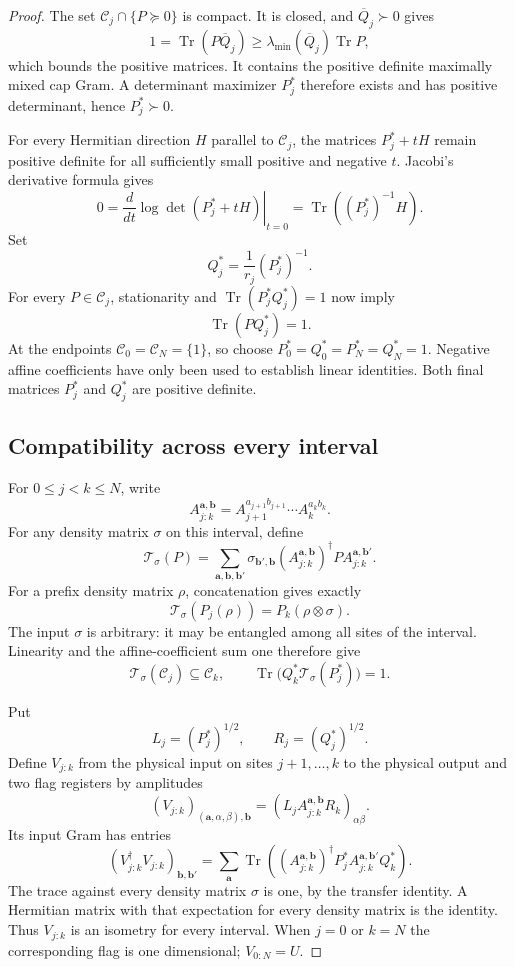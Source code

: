 \documentclass[11pt]{article}
\begin{document}
\begin{proof}
The set $\mathcal C_j\cap\{P\succeq0\}$ is compact. It is closed,
and $\overline Q_j\succ0$ gives
\[
 1=\operatorname{Tr}(P\overline Q_j)
     \geq\lambda_{\min}(\overline Q_j)\operatorname{Tr}P,
\]
which bounds the positive matrices. It contains the positive
definite maximally mixed cap Gram. A determinant maximizer $P_j^*$
therefore exists and has positive determinant, hence $P_j^*\succ0$.

For every Hermitian direction $H$ parallel to $\mathcal C_j$,
the matrices $P_j^*+tH$ remain positive definite for all sufficiently
small positive and negative $t$. Jacobi's derivative formula gives
\[
 0=\left.\frac{d}{dt}\log\det(P_j^*+tH)\right|_{t=0}
   =\operatorname{Tr}((P_j^*)^{-1}H).
\]
Set
\[
 Q_j^*=\frac1{r_j}(P_j^*)^{-1}.
\]
For every $P\in\mathcal C_j$, stationarity and
$\operatorname{Tr}(P_j^*Q_j^*)=1$ now imply
\[
 \operatorname{Tr}(P Q_j^*)=1.
\]
At the endpoints $\mathcal C_0=\mathcal C_N=\{1\}$, so choose
$P_0^*=Q_0^*=P_N^*=Q_N^*=1$.
Negative affine coefficients have only been used to establish
linear identities. Both final matrices $P_j^*$ and $Q_j^*$ are
positive definite.

\subsection*{Compatibility across every interval}

For $0\leq j<k\leq N$, write
\[
 A_{j:k}^{\mathbf a,\mathbf b}
 =A_{j+1}^{a_{j+1}b_{j+1}}\cdots A_k^{a_kb_k}.
\]
For any density matrix $\sigma$ on this interval, define
\[
 \mathcal T_\sigma(P)=
 \sum_{\mathbf a,\mathbf b,\mathbf b'}
 \sigma_{\mathbf b',\mathbf b}
 (A_{j:k}^{\mathbf a,\mathbf b})^\dagger
 P A_{j:k}^{\mathbf a,\mathbf b'}.
\]
For a prefix density matrix $\rho$, concatenation gives exactly
\[
 \mathcal T_\sigma(P_j(\rho))=P_k(\rho\otimes\sigma).
\]
The input $\sigma$ is arbitrary: it may be entangled among all
sites of the interval. Linearity and the affine-coefficient sum
one therefore give
\[
 \mathcal T_\sigma(\mathcal C_j)\subseteq\mathcal C_k,
 \qquad
 \operatorname{Tr}\bigl(Q_k^*\mathcal T_\sigma(P_j^*)\bigr)=1.
\]

Put
\[
 L_j=(P_j^*)^{1/2},\qquad R_j=(Q_j^*)^{1/2}.
\]
Define $V_{j:k}$ from the physical input on sites $j+1,\ldots,k$
to the physical output and two flag registers by amplitudes
\[
 (V_{j:k})_{(\mathbf a,\alpha,\beta),\mathbf b}
    =(L_j A_{j:k}^{\mathbf a,\mathbf b}R_k)_{\alpha\beta}.
\]
Its input Gram has entries
\[
 (V_{j:k}^\dagger V_{j:k})_{\mathbf b,\mathbf b'}
 =\sum_{\mathbf a}\operatorname{Tr}\!\left(
 (A_{j:k}^{\mathbf a,\mathbf b})^\dagger
 P_j^* A_{j:k}^{\mathbf a,\mathbf b'}Q_k^*\right).
\]
The trace against every density matrix $\sigma$ is one, by the
transfer identity. A Hermitian matrix with that expectation for
every density matrix is the identity. Thus $V_{j:k}$ is an
isometry for every interval. When $j=0$ or $k=N$ the corresponding
flag is one dimensional; $V_{0:N}=U$.


\end{proof}
\end{document}
